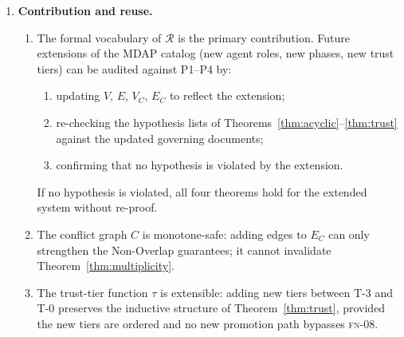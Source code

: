 \documentclass[12pt]{article}
\theoremstyle{definition}
\newcommand{\FN}[1]{\textsc{fn-#1}}
\begin{document}
\begin{enumerate}
    \item \textbf{Contribution and reuse.}
    \begin{enumerate}
        \item[(5.1)] The formal vocabulary of $\mathcal{R}$ is the
              primary contribution.
              Future extensions of the MDAP catalog (new agent roles,
              new phases, new trust tiers) can be audited against
              P1--P4 by:
              \begin{enumerate}[label=(\alph*)]
                \item updating $V$, $E$, $V_C$, $E_C$ to reflect the
                      extension;
                \item re-checking the hypothesis lists of
                      Theorems~\ref{thm:acyclic}--\ref{thm:trust}
                      against the updated governing documents;
                \item confirming that no hypothesis is violated by
                      the extension.
              \end{enumerate}
              If no hypothesis is violated, all four theorems hold for
              the extended system without re-proof.
        \item[(5.2)] The conflict graph $C$ is monotone-safe: adding
              edges to $E_C$ can only strengthen the Non-Overlap
              guarantees; it cannot invalidate
              Theorem~\ref{thm:multiplicity}.
        \item[(5.3)] The trust-tier function $\tau$ is extensible:
              adding new tiers between T-3 and T-0 preserves the
              inductive structure of Theorem~\ref{thm:trust}, provided
              the new tiers are ordered and no new promotion path
              bypasses \FN{08}.
    \end{enumerate}


\end{enumerate}
\end{document}

